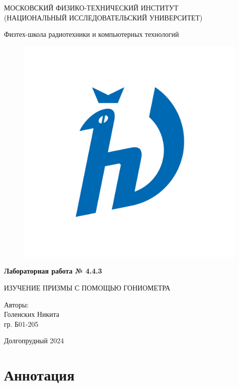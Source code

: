 
\long{}


\begin{titlepage}
    \begin{center}
    
    \Large МОСКОВСКИЙ ФИЗИКО-ТЕХНИЧЕСКИЙ ИНСТИТУТ \\ (НАЦИОНАЛЬНЫЙ ИССЛЕДОВАТЕЛЬСКИЙ УНИВЕРСИТЕТ)
    \vspace{0.3cm}
    
    \Large Физтех-школа радиотехники и компьютерных технологий
    \vspace{1cm}

  \begin{figure}[h]
    \centering
    \includegraphics[width=0.5\linewidth]{logo.png}
    \label{fig:logo} 
  \end{figure}

    \Huge {\bfseries Лабораторная работа № 4.4.3} 
    
ИЗУЧЕНИЕ ПРИЗМЫ С ПОМОЩЬЮ ГОНИОМЕТРА

    \vspace{1cm}
    
    \begin{flushright}
{\LARGE Авторы:\\ Голенских Никита \\ гр. Б01-205}
\end{flushright}
    
    \vspace{\fill}
    \Large Долгопрудный 2024
    
    \end{center}
    \end{titlepage}

    \tableofcontents
    \newpage
    
\section{Аннотация}

